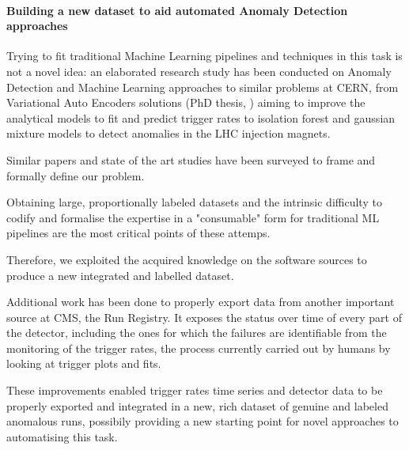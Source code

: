 \documentclass[a4, oneside, 10pt, nobib]{memoir}
\begin{document}
\begin{itemize}
		\end{itemize}


		\paragraph{Building a new dataset to aid automated Anomaly Detection approaches}

		Trying to fit traditional Machine Learning pipelines and techniques in this task is not a novel idea: an elaborated research study has been conducted on Anomaly Detection and Machine Learning approaches to similar problems at CERN, from Variational Auto Encoders solutions (PhD thesis, \cite{adpol-cvae}) aiming to improve the analytical models to fit and predict trigger rates to isolation forest and gaussian mixture models to detect anomalies in the LHC injection magnets.

		Similar papers and state of the art studies have been surveyed to frame and formally define our problem.

		Obtaining large, proportionally labeled datasets and the intrinsic difficulty to codify and formalise the expertise in a "consumable" form for traditional ML pipelines are the most critical points of these attemps.

		Therefore, we exploited the acquired knowledge on the software sources to produce a new integrated and labelled dataset.

		Additional work has been done to properly export data from another important source at CMS, the Run Registry. It exposes the status over time of every part of the detector, including the ones for which the failures are identifiable from the monitoring of the trigger rates, the process currently carried out by humans by looking at trigger plots and fits.

		These improvements enabled trigger rates time series and detector data to be properly exported and integrated in a new, rich dataset of genuine and labeled anomalous runs, possibily providing a new starting point for novel approaches to automatising this task.

\printbibliography
\end{document}
